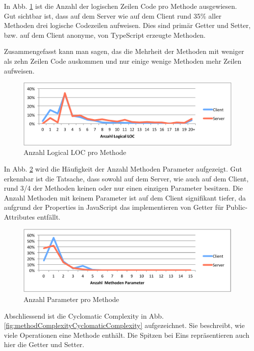 	In Abb. \ref{fig:methodComplexityLLOC} ist die Anzahl der logischen Zeilen Code pro Methode ausgewiesen.
	Gut sichtbar ist, dass auf dem Server wie auf dem Client rund 35\% aller Methoden drei logische Codezeilen aufweisen.
	Dies sind primär Getter und Setter, bzw. auf dem Client anonyme, von TypeScript erzeugte Methoden.
	
	Zusammengefasst kann man sagen, das die Mehrheit der Methoden mit weniger als zehn Zeilen Code auskommen und nur einige wenige Methoden mehr Zeilen aufweisen.
	
	\begin{figure}[H]
		\includegraphics[width=\textwidth]{projectPlan/media/img/methodComplexityLLOC.pdf}
		\centering
		\caption{Anzahl Logical LOC pro Methode}
		\label{fig:methodComplexityLLOC}
	\end{figure}
	
	In Abb. \ref{fig:methodComplexityParameterCount} wird die Häufigkeit der Anzahl Methoden Parameter aufgezeigt.
	Gut erkennbar ist die Tatsache, dass sowohl auf dem Server, wie auch auf dem Client,
	rund 3/4 der Methoden keinen oder nur einen einzigen Parameter besitzen.
	Die Anzahl Methoden mit keinem Parameter ist auf dem Client signifikant tiefer, da aufgrund der Properties in JavaScript das implementieren von Getter für Public-Attributes entfällt.
	
	
	\begin{figure}[H]
		\includegraphics[width=\textwidth]{projectPlan/media/img/methodComplexityParameterCount.pdf}
		\centering
		\caption{Anzahl Parameter pro Methode}
		\label{fig:methodComplexityParameterCount}
	\end{figure}
	Abschliessend ist die Cyclomatic Complexity in Abb. \ref{fig:methodComplexityCyclomaticComplexity} aufgezeichnet.  
	Sie beschreibt, wie viele Operationen eine Methode enthält.
	Die Spitzen bei Eins repräsentieren auch hier die Getter und Setter.
	
